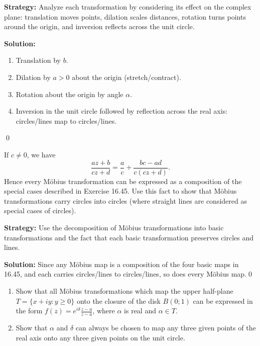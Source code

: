 \noindent\textbf{Strategy:} Analyze each transformation by considering its effect on the complex plane: translation moves points, dilation scales distances, rotation turns points around the origin, and inversion reflects across the unit circle.

\bigskip\noindent\textbf{Solution:}
\begin{enumerate}[label=(\alph*)]
\item Translation by $b$.
\item Dilation by $a>0$ about the origin (stretch/contract).
\item Rotation about the origin by angle $\alpha$.
\item Inversion in the unit circle followed by reflection across the real axis: circles/lines map to circles/lines.
\end{enumerate}\qed


\begin{problembox}
\begin{problemstatement}
If \( c \neq 0 \), we have
\[ \frac{a z + b}{c z + d} = \frac{a}{c} + \frac{b c - a d}{c (c z + d)}. \]
Hence every Möbius transformation can be expressed as a composition of the special cases described in Exercise 16.45. Use this fact to show that Möbius transformations carry circles into circles (where straight lines are considered as special cases of circles).
\end{problemstatement}
\end{problembox}

\noindent\textbf{Strategy:} Use the decomposition of Möbius transformations into basic transformations and the fact that each basic transformation preserves circles and lines.

\bigskip\noindent\textbf{Solution:}
Since any Möbius map is a composition of the four basic maps in 16.45, and each carries circles/lines to circles/lines, so does every Möbius map.\qed


\begin{problembox}
\begin{problemstatement}
\begin{enumerate}[label=(\alph*)]
\item Show that all Möbius transformations which map the upper half-plane \( T = \{ x + i y : y \geq 0 \} \) onto the closure of the disk \( B(0; 1) \) can be expressed in the form \( f(z) = e^{i \delta} \frac{z - a}{z - \bar{a}} \), where \( \alpha \) is real and \( \alpha \in T \).
\item Show that \( \alpha \) and \( \delta \) can always be chosen to map any three given points of the real axis onto any three given points on the unit circle.
\end{enumerate}
\end{problemstatement}
\end{problembox}

